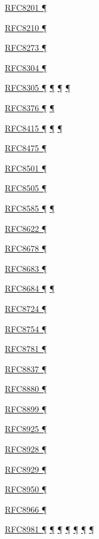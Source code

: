 \documentclass[
]{article}
\begin{document}
\hyperref[packet-size-and-jumbo-frames]{RFC8201 ¶}

\hyperref[filtering]{RFC8210 ¶}

\hyperref[prefix-per-host]{RFC8273 ¶}

\hyperref[transport-protocols]{RFC8304 ¶}

\hyperref[how-an-application-programmer-sees-ipv6]{RFC8305 ¶}
\hyperref[dual-stack-scenarios]{¶} \hyperref[multihoming]{¶}
\hyperref[deployment-in-the-home]{¶}

\hyperref[layer-2-functions]{RFC8376 ¶} \hyperref[energy-consumption]{¶}

\hyperref[managed-configuration]{RFC8415 ¶}
\hyperref[address-planning]{¶} \hyperref[prefix-per-host]{¶}

\hyperref[multi-prefix-operation]{RFC8475 ¶}

\hyperref[dns]{RFC8501 ¶}

\hyperref[address-resolution]{RFC8505 ¶}

\hyperref[routing]{RFC8585 ¶} \hyperref[dual-stack-scenarios]{¶}

\hyperref[traffic-class-and-flow-label]{RFC8622 ¶}

\hyperref[multi-prefix-operation]{RFC8678 ¶}

\hyperref[translation-and-ipv4-as-a-service]{RFC8683 ¶}

\hyperref[transport-protocols]{RFC8684 ¶} \hyperref[multihoming]{¶}

\hyperref[energy-consumption]{RFC8724 ¶}

\hyperref[extension-headers-and-options]{RFC8754 ¶}

\hyperref[translation-and-ipv4-as-a-service]{RFC8781 ¶}

\hyperref[traffic-class-and-flow-label]{RFC8837 ¶}

\hyperref[translation-and-ipv4-as-a-service]{RFC8880 ¶}

\hyperref[extension-headers-and-options]{RFC8899 ¶}

\hyperref[dual-stack-scenarios]{RFC8925 ¶}

\hyperref[address-resolution]{RFC8928 ¶}

\hyperref[address-resolution]{RFC8929 ¶}

\hyperref[routing]{RFC8950 ¶}

\hyperref[routing]{RFC8966 ¶}

\hyperref[addresses]{RFC8981 ¶} \hyperref[auto-configuration]{¶}
\hyperref[layer-2-considerations]{¶} \hyperref[topology-obfuscation]{¶}
\hyperref[prefix-per-host]{¶}
\hyperref[address-and-prefix-management]{¶}
\hyperref[multi-prefix-operation]{¶}
\end{document}
